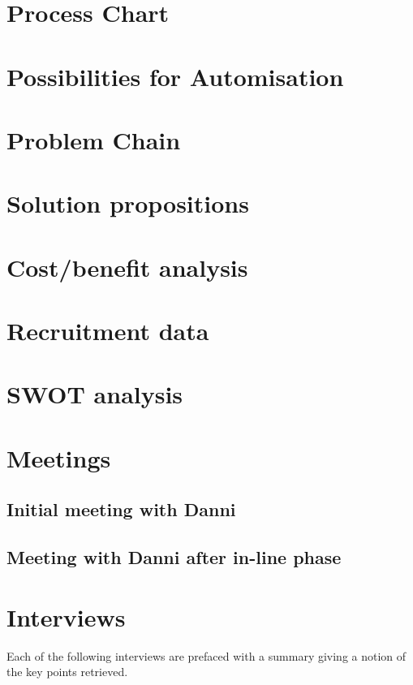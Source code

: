 \chapter{Process Chart}

\chapter{Possibilities for Automisation}

\chapter{Problem Chain}

\chapter{Solution propositions}

\chapter{Cost/benefit analysis}

\chapter{Recruitment data}

\chapter{SWOT analysis}


\chapter{Meetings}
\section{Initial meeting with Danni}

\section{Meeting with Danni after in-line phase}


\chapter{Interviews}
\label{app:interviews}
Each of the following interviews are prefaced with a summary giving a notion of the key points retrieved.


